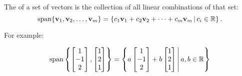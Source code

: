 \begin{applicationActivities}
\begin{definition}
  The  of a set of vectors is the collection of all linear
  combinations of that set:
  \[
    \operatorname{span}\{\mathbf v_1,\mathbf v_2,\dots,\mathbf v_m\} =
    \left\{c_1\mathbf v_1+c_2\mathbf v_2+\dots+c_m\mathbf v_m\,\middle|\,
    c_i\in\mathbb{R}\right\}.
  \]

	\vspace{2em}

  For example:

  \[
    \operatorname{span}\left\{
      \begin{bmatrix} 1 \\ -1 \\ 2 \end{bmatrix},
      \begin{bmatrix} 1 \\ 2 \\ 1 \end{bmatrix}
    \right\} = \left\{
      a\begin{bmatrix} 1 \\ -1 \\ 2 \end{bmatrix}+
      b\begin{bmatrix} 1 \\ 2 \\ 1 \end{bmatrix}
    \,\middle|\,
      a,b\in\mathbb{R}
    \right\}
  \]
\end{definition}


\end{applicationActivities}
